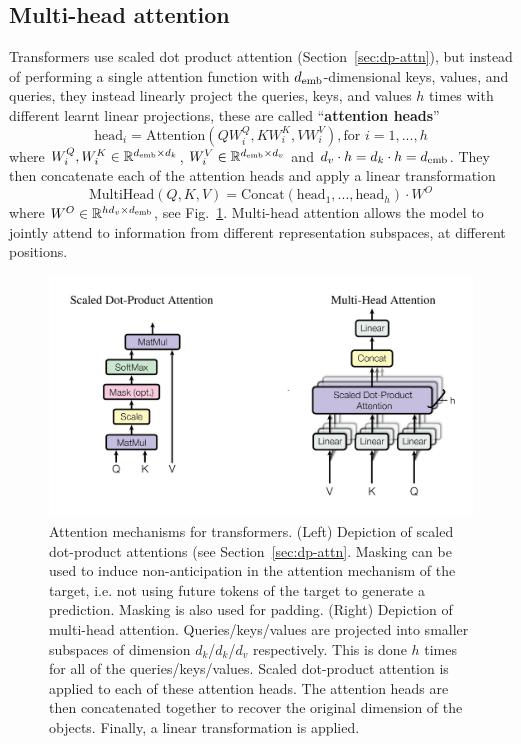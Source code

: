 \documentclass[11pt]{article}
\numberwithin{equation}{section}
\begin{document}
\subsection{Multi-head attention} \label{sec:multi_head_attn}
Transformers use scaled dot product attention (Section~\ref{sec:dp-attn}), but instead of performing a single attention function with $d_{\text{emb}}$-dimensional keys, values, and queries, they instead linearly project the queries, keys, and values $h$ times with different learnt linear projections, these are called ``\textbf{attention heads}''
\begin{equation}
\text{head}_i = \text{Attention}(QW_i^Q, KW_i^K, VW_i^V), \text{for } i = 1,...,h
\end{equation}
where $W_i^Q, W_i^K \in \mathbb{R}^{d_{\text{emb}} \times d_k}$, $W_i^V \in \mathbb{R}^{d_{\text{emb}} \times d_v}$ and $d_v \cdot h = d_k \cdot h = d_{\text{emb}}$. They then concatenate each of the attention heads and apply a linear transformation
\begin{equation}
\text{MultiHead}(Q, K, V) = \text{Concat}(\text{head}_1, ..., \text{head}_h) \cdot W^O
\end{equation}
where $W^O \in \mathbb{R}^{h d_v \times d_{\text{emb}}}$, see Fig.~\ref{fig:multi_head_attn}. Multi-head attention allows the model to jointly attend to information from different representation subspaces, at different positions. 

\begin{figure}
\begin{center}
\includegraphics[width=0.7\columnwidth]{../figures/multi-head-attn.jpg}  
\end{center}
\caption{Attention mechanisms for transformers. (Left) Depiction of scaled dot-product attentions (see Section~\ref{sec:dp-attn}. Masking can be used to induce non-anticipation in the attention mechanism of the target, i.e. not using future tokens of the target to generate a prediction. Masking is also used for padding. (Right) Depiction of multi-head attention. Queries/keys/values are projected into smaller subspaces of dimension $d_k$/$d_k$/$d_v$ respectively. This is done $h$ times for all of the queries/keys/values. Scaled dot-product attention is applied to each of these attention heads. The attention heads are then concatenated together to recover the original dimension of the objects. Finally, a linear transformation is applied.}
\label{fig:multi_head_attn}
\end{figure}
\end{document}
